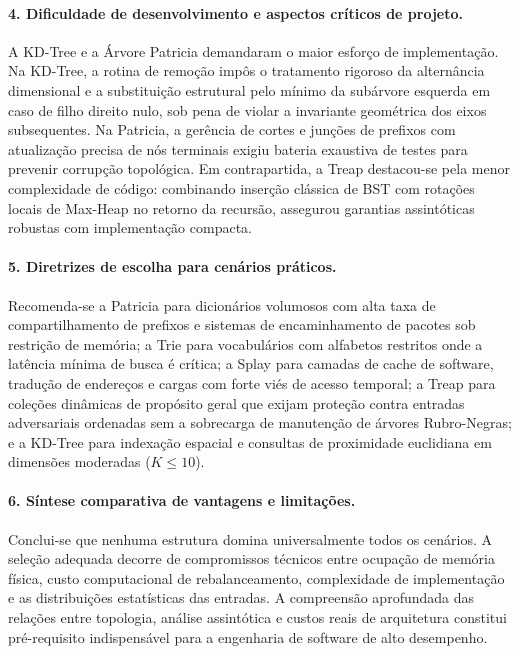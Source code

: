 \documentclass[11pt, a4paper]{article}
\begin{document}
\paragraph{4. Dificuldade de desenvolvimento e aspectos críticos de projeto.}
A KD-Tree e a Árvore Patricia demandaram o maior esforço de implementação. Na KD-Tree, a rotina de remoção impôs o tratamento rigoroso da alternância dimensional e a substituição estrutural pelo mínimo da subárvore esquerda em caso de filho direito nulo, sob pena de violar a invariante geométrica dos eixos subsequentes. Na Patricia, a gerência de cortes e junções de prefixos com atualização precisa de nós terminais exigiu bateria exaustiva de testes para prevenir corrupção topológica. Em contrapartida, a Treap destacou-se pela menor complexidade de código: combinando inserção clássica de BST com rotações locais de Max-Heap no retorno da recursão, assegurou garantias assintóticas robustas com implementação compacta.

\paragraph{5. Diretrizes de escolha para cenários práticos.}
Recomenda-se a Patricia para dicionários volumosos com alta taxa de compartilhamento de prefixos e sistemas de encaminhamento de pacotes sob restrição de memória; a Trie para vocabulários com alfabetos restritos onde a latência mínima de busca é crítica; a Splay para camadas de cache de software, tradução de endereços e cargas com forte viés de acesso temporal; a Treap para coleções dinâmicas de propósito geral que exijam proteção contra entradas adversariais ordenadas sem a sobrecarga de manutenção de árvores Rubro-Negras; e a KD-Tree para indexação espacial e consultas de proximidade euclidiana em dimensões moderadas ($K \le 10$).

\paragraph{6. Síntese comparativa de vantagens e limitações.}
Conclui-se que nenhuma estrutura domina universalmente todos os cenários. A seleção adequada decorre de compromissos técnicos entre ocupação de memória física, custo computacional de rebalanceamento, complexidade de implementação e as distribuições estatísticas das entradas. A compreensão aprofundada das relações entre topologia, análise assintótica e custos reais de arquitetura constitui pré-requisito indispensável para a engenharia de software de alto desempenho.
\end{document}
